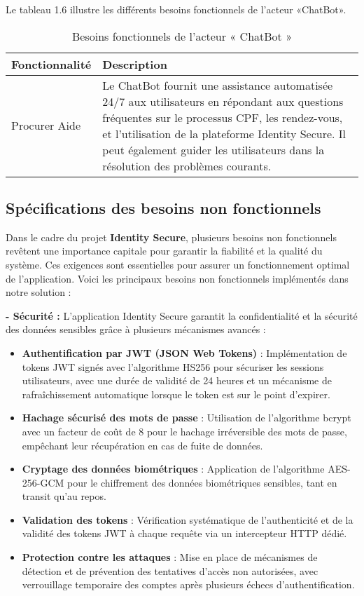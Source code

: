 Le tableau 1.6 illustre les différents besoins fonctionnels de l'acteur «ChatBot».
\begin{table}[H]
\centering
\caption{\centering Besoins fonctionnels de l'acteur « ChatBot »}
\label{tab:backlog:ch1:2}
\begin{tabular}
{| >{\centering\arraybackslash}p{4.2cm} | >{\centering\arraybackslash}p{12.5cm} |}
\rowcolor{gray!30}

\hline \textbf{Fonctionnalité} & \textbf{Description}\\
\hline Procurer Aide &  Le ChatBot fournit une assistance automatisée 24/7 aux utilisateurs en répondant aux questions fréquentes sur le processus CPF, les rendez-vous, et l'utilisation de la plateforme Identity Secure. Il peut également guider les utilisateurs dans la résolution des problèmes courants.\\
\hline
\end{tabular}
\end{table}
\subsection{Spécifications des besoins non fonctionnels}
Dans le cadre du projet \textbf{Identity Secure}, plusieurs besoins non fonctionnels revêtent une importance capitale pour garantir la fiabilité et la qualité du système. Ces exigences sont essentielles pour assurer un fonctionnement optimal de l'application. Voici les principaux besoins non fonctionnels implémentés dans notre solution :

\textbf{-  Sécurité :} L'application Identity Secure garantit la confidentialité et la sécurité des données sensibles grâce à plusieurs mécanismes avancés :
\begin{itemize}[label=$\circ$]
  \item \textbf{Authentification par JWT (JSON Web Tokens)} : Implémentation de tokens JWT signés avec l'algorithme HS256 pour sécuriser les sessions utilisateurs, avec une durée de validité de 24 heures et un mécanisme de rafraîchissement automatique lorsque le token est sur le point d'expirer.
  \item \textbf{Hachage sécurisé des mots de passe} : Utilisation de l'algorithme bcrypt avec un facteur de coût de 8 pour le hachage irréversible des mots de passe, empêchant leur récupération en cas de fuite de données.
  \item \textbf{Cryptage des données biométriques} : Application de l'algorithme AES-256-GCM pour le chiffrement des données biométriques sensibles, tant en transit qu'au repos.
  \item \textbf{Validation des tokens} : Vérification systématique de l'authenticité et de la validité des tokens JWT à chaque requête via un intercepteur HTTP dédié.
  \item \textbf{Protection contre les attaques} : Mise en place de mécanismes de détection et de prévention des tentatives d'accès non autorisées, avec verrouillage temporaire des comptes après plusieurs échecs d'authentification.
\end{itemize}

